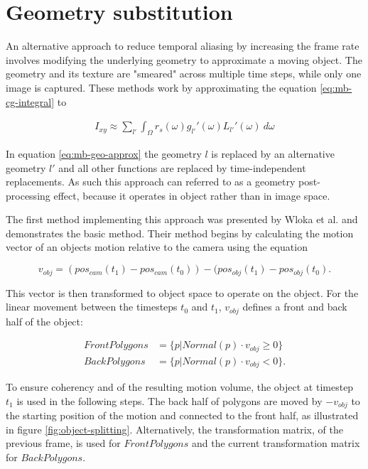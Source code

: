 \section{Geometry substitution}
\label{ch:mb-gs}
An alternative approach to reduce temporal aliasing by increasing the frame rate involves modifying the underlying geometry to approximate a moving object.
The geometry and its texture are "smeared" across multiple time steps, while only one image is captured.
These methods work by approximating the equation \ref{eq:mb-cg-integral} to 

\begin{align}
    I_{xy} \approx \sum_{l'} \int_\Omega r_s(\omega)g_{l'}'(\omega)L_{l'}'(\omega) \: d\omega
    \label{eq:mb-geo-approx}
\end{align}

In equation \ref{eq:mb-geo-approx} the geometry $l$ is replaced by an alternative geometry $l'$ and all other functions are replaced by time-independent replacements.
As such this approach can referred to as a geometry post-processing effect, because it operates in object rather than in image space.

The first method implementing this approach was presented by Wloka et al. \cite{Wloka.1996} and demonstrates the basic method.
Their method begins by calculating the motion vector of an objects motion relative to the camera using the equation

$$
v_{obj} = (pos_{cam}(t_1) - pos_{cam}(t_0)) - (pos_{obj}(t_1) - pos_{obj}(t_0).
$$

This vector is then transformed to object space to operate on the object.
For the linear movement between the timesteps $t_0$ and $t_1$, $v_{obj}$ defines a front and back half of the object:

\begin{align}
    FrontPolygons &= \{ p |  Normal(p) \cdot v_{obj} \geq 0 \} \\
    BackPolygons  &= \{ p |  Normal(p) \cdot v_{obj} < 0 \}.
\end{align}

To ensure coherency and of the resulting motion volume, the object at timestep $t_1$ is used in the following steps.
The back half of polygons are moved by $-v_{obj}$ to the starting position of the motion and connected to the front half, as illustrated in figure \ref{fig:object-splitting}.
Alternatively, the transformation matrix, of the previous frame, is used for $FrontPolygons$ and the current transformation matrix for $BackPolygons$.

